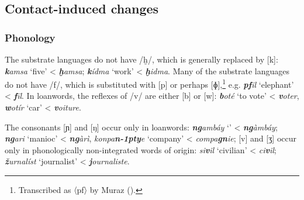 \documentclass[output=paper]{langsci/langscibook}
\begin{document}
 
 \subsection{Contact-induced changes}
 \subsubsection{Phonology}

The {substrate} languages do not have /ḫ/, which is generally replaced by [k]:  \textbf{\textit{k}}\textit{amsa} ‘five’ <  \textbf{\textit{ḫ}}\textit{amsa};   \textbf{\textit{k}}\textit{ídma} ‘work’ <  \textbf{\textit{ḫ}}\textit{idma}. Many of the {substrate} languages do not have /f/, which is substituted with [p] or perhaps [ɸ],\footnote{Transcribed as 〈pf〉 by Muraz (\citeyear[168]{Muraz1926}).} e.g.  \textit{\textbf{pf}il} ‘elephant’ <  \textit{\textbf{f}īl}. In  {loanwords}, the reflexes of /v/ are either [b] or [w]:   \textit{\textbf{b}oté} ‘to vote’ <  \textit{\textbf{v}oter}, \textit{\textbf{w}otír} ‘car’ <  \textit{\textbf{v}oiture}.  

  The consonants [ɲ] and [ŋ] occur only in {loanwords}:   \textit{\textbf{ng}ambáy} ‘’ <  \textit{\textbf{ng}àmbáy};  \textit{\textbf{ng}ari} ‘manioc’ <  \textit{\textbf{ng}àrì}, \textit{konpa}\textit{\textbf{n\kern -1pty}e} ‘company’ <  \textit{compa}\textit{\textbf{gn}ie}; [v] and [ʒ] occur only in phonologically non-integrated words of  origin:  \textit{si}\textit{\textbf{v}il} ‘civilian’ <  \textit{ci}\textit{\textbf{v}il};   \textit{\textbf{ž}urnalíst} `journalist' <  \textit{\textbf{j}ournaliste}. 
\end{document}
